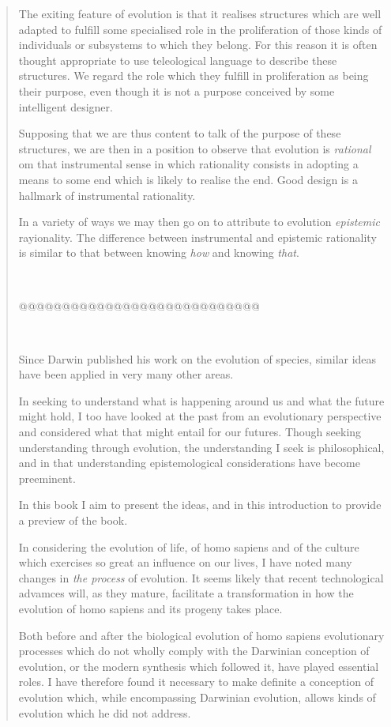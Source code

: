 {\begin{quote}
The exiting feature of evolution is that it realises structures which are well adapted to fulfill some specialised role in the proliferation of those kinds of individuals or subsystems to which they belong.
For this reason it is often thought appropriate to use teleological language to describe these structures.
We regard the role which they fulfill in proliferation as being their purpose, even though it is not a purpose conceived by some intelligent designer.

Supposing that we are thus content to talk of the purpose of these structures, we are then in a position to observe that evolution is \emph{rational} om that instrumental sense in which rationality consists in adopting a means to some end which is likely to realise the end.
Good design is a hallmark of instrumental rationality.

In a variety of ways we may then go on to attribute to evolution \emph{epistemic} rayionality.
The difference between instrumental and epistemic rationality is similar to that between knowing \emph{how} and knowing \emph{that}.



\ 

@@@@@@@@@@@@@@@@@@@@@@@@@@@@

\

Since Darwin published his work on the evolution of species, similar ideas have been applied in very many other areas.

In seeking to understand what is happening around us and what the future might hold, I too have looked at the past from an evolutionary perspective and considered what that might entail for our futures.
Though seeking understanding through evolution, the understanding I seek is philosophical, and in that understanding epistemological considerations have become preeminent.

In this book I aim to present the ideas, and in this introduction to provide a preview of the book.

In considering the evolution of life, of homo sapiens and of the culture which exercises so great an influence on our lives, I have noted many changes in \emph{the process} of evolution.
It seems likely that recent technological advamces will, as they mature, facilitate a transformation in how the evolution of homo sapiens and its progeny takes place.

Both before and after the biological evolution of homo sapiens evolutionary processes which do not wholly comply with the Darwinian conception of evolution, or the modern synthesis which followed it, have played essential roles.
I have therefore found it necessary to make definite a conception of evolution which, while encompassing Darwinian evolution, allows kinds of evolution which he did not address.


\end{quote}}
